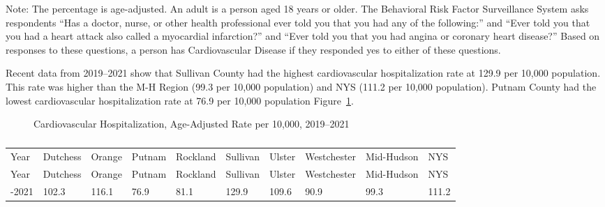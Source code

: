 \documentclass[
  english,
  letterpaper,
]{report}
\begin{document}
\begin{tcolorbox}[enhanced jigsaw, breakable, leftrule=.75mm, title=\textcolor{quarto-callout-note-color}{\faInfo}\hspace{0.5em}{Note}, bottomrule=.15mm, opacityback=0, left=2mm, colback=white, bottomtitle=1mm, coltitle=black, colbacktitle=quarto-callout-note-color!10!white, colframe=quarto-callout-note-color-frame, opacitybacktitle=0.6, toptitle=1mm, titlerule=0mm, arc=.35mm, rightrule=.15mm, toprule=.15mm]

Note: The percentage is age-adjusted. An adult is a person aged 18 years
or older. The Behavioral Risk Factor Surveillance System asks
respondents ``Has a doctor, nurse, or other health professional ever
told you that you had any of the following:'' and ``Ever told you that
you had a heart attack also called a myocardial infarction?'' and ``Ever
told you that you had angina or coronary heart disease?'' Based on
responses to these questions, a person has Cardiovascular Disease if
they responded yes to either of these questions.

\end{tcolorbox}

Recent data from 2019--2021 show that Sullivan County had the highest
cardiovascular hospitalization rate at 129.9 per 10,000 population. This
rate was higher than the M-H Region (99.3 per 10,000 population) and NYS
(111.2 per 10,000 population). Putnam County had the lowest
cardiovascular hospitalization rate at 76.9 per 10,000 population
Figure~\ref{fig-cardiovasdz-hospi-aar}.

\begin{figure}


\caption{\label{fig-cardiovasdz-hospi-aar}Cardiovascular
Hospitalization, Age-Adjusted Rate per 10,000, 2019--2021}

\end{figure}%

\begin{longtable}[]{@{}llllllllll@{}}

\caption{\label{tbl-cardiovasdz-hospi-aar}Cardiovascular
Hospitalization, Age-Adjusted Rate per 10,000, 2019--2021}

\tabularnewline

\caption{}\label{T_27b3c}\tabularnewline
\toprule\noalign{}
Year & Dutchess & Orange & Putnam & Rockland & Sullivan & Ulster &
Westchester & Mid-Hudson & NYS \\
\midrule\noalign{}
\endfirsthead
\toprule\noalign{}
Year & Dutchess & Orange & Putnam & Rockland & Sullivan & Ulster &
Westchester & Mid-Hudson & NYS \\
\midrule\noalign{}
\endhead
\bottomrule\noalign{}
\endlastfoot
2019-2021 & 102.3 & 116.1 & 76.9 & 81.1 & 129.9 & 109.6 & 90.9 & 99.3 &
111.2 \\

\end{longtable}
\end{document}
